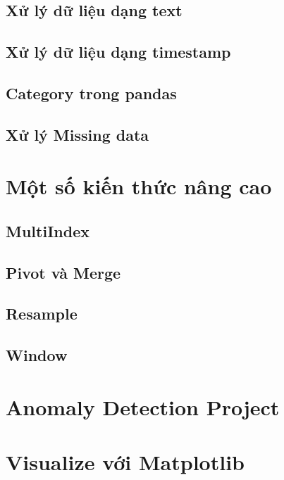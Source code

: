 \documentclass[
]{book}
\begin{document}
\hypertarget{xux1eed-luxfd-dux1eef-liux1ec7u-dux1ea1ng-text}{%
\section{Xử lý dữ liệu dạng text}\label{xux1eed-luxfd-dux1eef-liux1ec7u-dux1ea1ng-text}}

\hypertarget{xux1eed-luxfd-dux1eef-liux1ec7u-dux1ea1ng-timestamp}{%
\section{Xử lý dữ liệu dạng timestamp}\label{xux1eed-luxfd-dux1eef-liux1ec7u-dux1ea1ng-timestamp}}

\hypertarget{category-trong-pandas}{%
\section{Category trong pandas}\label{category-trong-pandas}}

\hypertarget{xux1eed-luxfd-missing-data}{%
\section{Xử lý Missing data}\label{xux1eed-luxfd-missing-data}}

\hypertarget{mux1ed9t-sux1ed1-kiux1ebfn-thux1ee9c-nuxe2ng-cao}{%
\chapter{Một số kiến thức nâng cao}\label{mux1ed9t-sux1ed1-kiux1ebfn-thux1ee9c-nuxe2ng-cao}}

\hypertarget{multiindex}{%
\section{MultiIndex}\label{multiindex}}

\hypertarget{pivot-vuxe0-merge}{%
\section{Pivot và Merge}\label{pivot-vuxe0-merge}}

\hypertarget{resample}{%
\section{Resample}\label{resample}}

\hypertarget{window}{%
\section{Window}\label{window}}

\hypertarget{anomaly-detection-project}{%
\chapter{Anomaly Detection Project}\label{anomaly-detection-project}}

\hypertarget{visualize-vux1edbi-matplotlib}{%
\chapter{Visualize với Matplotlib}\label{visualize-vux1edbi-matplotlib}}

\printindex
\end{document}
